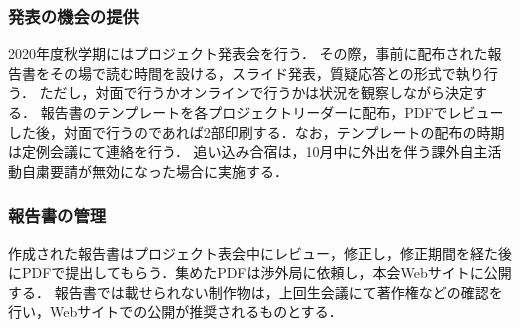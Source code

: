 \subsubsection* {発表の機会の提供}

2020年度秋学期にはプロジェクト発表会を行う．
その際，事前に配布された報告書をその場で読む時間を設ける，スライド発表，質疑応答との形式で執り行う．
ただし，対面で行うかオンラインで行うかは状況を観察しながら決定する．
報告書のテンプレートを各プロジェクトリーダーに配布，PDFでレビューした後，対面で行うのであれば2部印刷する．なお，テンプレートの配布の時期は定例会議にて連絡を行う．
追い込み合宿は，10月中に外出を伴う課外自主活動自粛要請が無効になった場合に実施する．

\subsubsection* {報告書の管理}

作成された報告書はプロジェクト表会中にレビュー，修正し，修正期間を経た後にPDFで提出してもらう．集めたPDFは渉外局に依頼し，本会Webサイトに公開する．
報告書では載せられない制作物は，上回生会議にて著作権などの確認を行い，Webサイトでの公開が推奨されるものとする．
